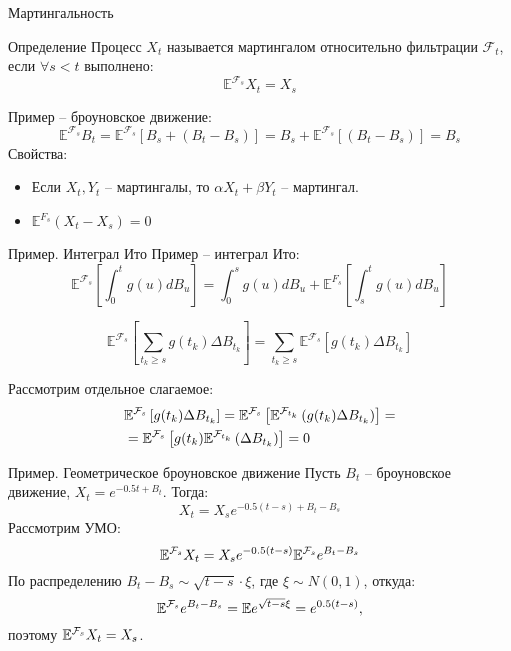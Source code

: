 \documentclass{beamer}
\begin{document}
%
%
%
\begin{frame}{Мартингальность}
    \begin{block}{Определение}
        Процесс $X_t$ называется мартингалом относительно фильтрации $\mathcal{F}_t$, если $\forall s < t$ выполнено:
        $$
            \mathbb{E}^{\mathcal{F}_s} X_t = X_s
        $$
    \end{block}
     
    Пример -- броуновское движение:
    $$
        \mathbb{E}^{\mathcal{F}_s} B_t
        = \mathbb{E}^{\mathcal{F}_s} \left[ B_s + (B_t - B_s) \right]
        = B_s + \mathbb{E}^{\mathcal{F}_s} \left[ (B_t - B_s) \right] = B_s
    $$ 
    Свойства:
    \begin{itemize}
        \item Если $X_t, Y_t$ -- мартингалы, то $\alpha X_t + \beta Y_t$ -- мартингал.
        \item $\mathbb{E}^{F_s} (X_t - X_s) = 0$
    \end{itemize}
\end{frame}

\begin{frame}{Пример. Интеграл Ито}
    Пример -- интеграл Ито:
    $$
        \mathbb{E}^{\mathcal{F}_s} \left[ \int_0^t g(u) dB_u\right]= 
        \int_0^s g(u) dB_u + \mathbb{E}^{F_s} \left[\int_s^t g(u) dB_u\right]
    $$
     
    $$
        \mathbb{E}^{\mathcal{F}_s} \left[ \sum_{t_k \geq s} g(t_k) \Delta B_{t_k}\right]
        = \sum_{t_k \geq s} \mathbb{E}^{\mathcal{F}_s} \left[g(t_k) \Delta B_{t_k} \right]
    $$
    
    Рассмотрим отдельное слагаемое:
    \begin{align*}
        & \mathbb{E}^{\mathcal{F}_s} \left[g(t_k) \Delta B_{t_k} \right]
        = \mathbb{E}^{\mathcal{F}_s} \left[
        \mathbb{E}^{\mathcal{F}_{t_k}} \left(g(t_k) \Delta B_{t_k}\right) \right] = \\
        & = \mathbb{E}^{\mathcal{F}_s} \left[ g(t_k) \mathbb{E}^{\mathcal{F}_{t_k}} \left(\Delta B_{t_k}\right) \right]= 0
    \end{align*}
    
\end{frame}

\begin{frame}{Пример. Геометрическое броуновское движение}
    Пусть $B_t$ -- броуновское движение, $X_t = e^{-0.5 t + B_t}$. 
    Тогда:
    $$
        X_t = X_s e^{-0.5 (t - s) + B_t - B_s}
    $$
    Рассмотрим УМО:
    $$
        \mathbb{E}^{\mathcal{F}_{s}} X_t = X_s e^{-0.5(t-s)} \mathbb{E}^{\mathcal{F}_s} e^{B_t - B_s}
    $$
    По распределению $B_t - B_s \sim \sqrt{t-s}\cdot \xi$, где $\xi \sim N(0,1)$, откуда:
    $$
    \mathbb{E}^{\mathcal{F}_s} e^{B_t - B_s} = \mathbb{E} e^{\sqrt{t-s}\xi} = e^{0.5(t-s)},
    $$поэтому $\mathbb{E}^{\mathcal{F}_{s}} X_t = X_s$.
\end{frame}
\end{document}

